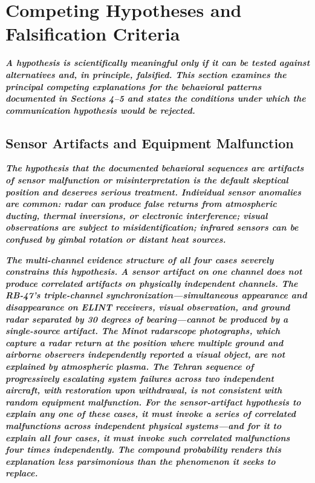 \documentclass[11pt,letterpaper]{article}
\begin{document}
\section{Competing Hypotheses and Falsification Criteria}

\textbf{\textit{A hypothesis is scientifically meaningful only if it can be tested against alternatives and, in principle, falsified. This section examines the principal competing explanations for the behavioral patterns documented in Sections 4--5 and states the conditions under which the communication hypothesis would be rejected.}}


\subsection{Sensor Artifacts and Equipment Malfunction}

\textbf{\textit{The hypothesis that the documented behavioral sequences are artifacts of sensor malfunction or misinterpretation is the default skeptical position and deserves serious treatment. Individual sensor anomalies are common: radar can produce false returns from atmospheric ducting, thermal inversions, or electronic interference; visual observations are subject to misidentification; infrared sensors can be confused by gimbal rotation or distant heat sources.}}


\textbf{\textit{The multi-channel evidence structure of all four cases severely constrains this hypothesis. A sensor artifact on one channel does not produce correlated artifacts on physically independent channels. The RB-47's triple-channel synchronization---simultaneous appearance and disappearance on ELINT receivers, visual observation, and ground radar separated by 30 degrees of bearing---cannot be produced by a single-source artifact. The Minot radarscope photographs, which capture a radar return at the position where multiple ground and airborne observers independently reported a visual object, are not explained by atmospheric plasma. The Tehran sequence of progressively escalating system failures across two independent aircraft, with restoration upon withdrawal, is not consistent with random equipment malfunction. For the sensor-artifact hypothesis to explain any one of these cases, it must invoke a series of correlated malfunctions across independent physical systems---and for it to explain all four cases, it must invoke such correlated malfunctions four times independently. The compound probability renders this explanation less parsimonious than the phenomenon it seeks to replace.}}
\end{document}
